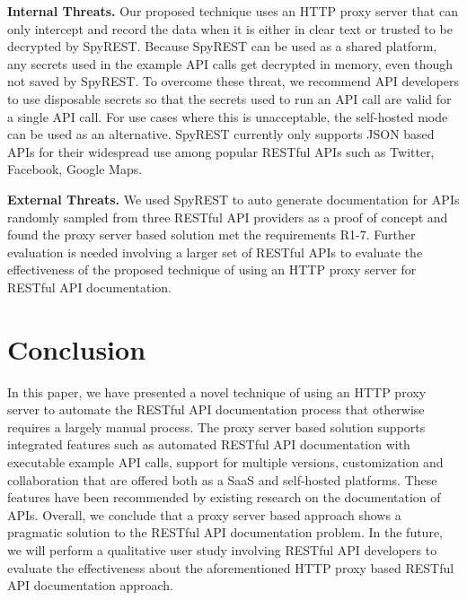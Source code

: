 \documentclass[conference]{IEEEtran}
\begin{document}
\textbf{Internal Threats.} Our proposed technique uses an HTTP proxy server that can only intercept and record the data when it is either in clear text or trusted to be decrypted by SpyREST. Because SpyREST can be used as a shared platform, any secrets used in the example API calls get decrypted in memory, even though not saved by SpyREST. To overcome these threat, we recommend API developers to use disposable secrets so that the secrets used to run an API call are valid for a single API call. For use cases where this is unacceptable, the self-hosted mode can be used as an alternative. SpyREST currently only supports JSON based APIs for their widespread use among popular RESTful APIs such as Twitter, Facebook, Google Maps.

\textbf{External Threats.} We used SpyREST to auto generate documentation for APIs randomly sampled from three RESTful API providers as a proof of concept and found the proxy server based solution met the requirements R1-7. Further evaluation is needed involving a larger set of RESTful APIs to evaluate the effectiveness of the proposed technique of using an HTTP proxy server for RESTful API documentation.

\section{Conclusion}
In this paper, we have presented a novel technique of using an HTTP proxy server to automate the RESTful API documentation process that otherwise requires a largely manual process. The proxy server based solution supports integrated features such as automated RESTful API documentation with executable example API calls, support for multiple versions, customization and collaboration that are offered both as a SaaS and self-hosted platforms. These features have been recommended by existing research on the documentation of APIs. Overall, we conclude that a proxy server based approach shows a pragmatic solution to the RESTful API documentation problem. In the future, we will perform a qualitative user study involving RESTful API developers to evaluate the effectiveness about the aforementioned HTTP proxy based RESTful API documentation approach.


\end{document}
